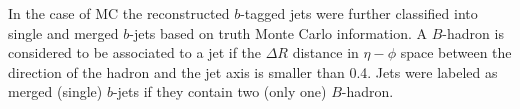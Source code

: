 In the case of MC the reconstructed $b$-tagged jets were further classified into single and merged $b$-jets based on truth Monte Carlo information. A $B$-hadron is considered to be associated to a jet if the $\Delta R$ distance in $\eta-\phi$ space between the direction of the hadron and the jet axis is smaller than 0.4. Jets were labeled as merged (single) $b$-jets if they contain two (only one) $B$-hadron.%

 






